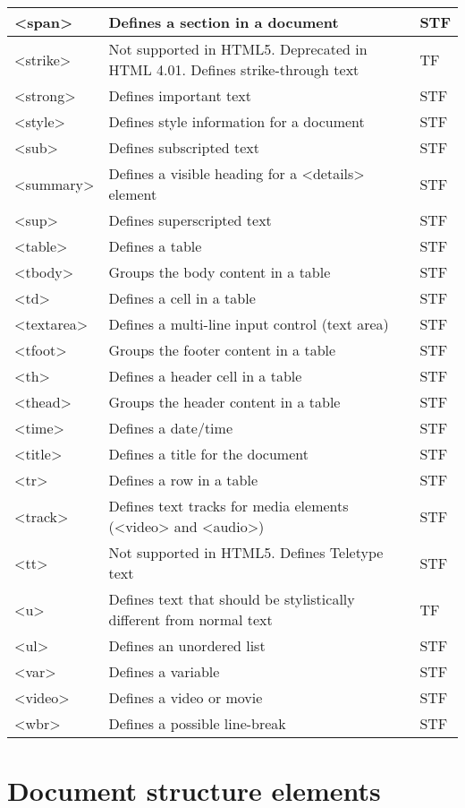 \begin{longtable}{|p{60pt}|p{320pt}|p{40pt}|}
\hline
<span>		&	Defines a section in a document & STF\\
\hline
<strike>		&	Not supported in HTML5. Deprecated in HTML 4.01. Defines strike-through text & TF\\
\hline
<strong>		&	Defines important text & STF\\
\hline
<style>		&	Defines style information for a document & STF \\
\hline
<sub>		&	Defines subscripted text & STF\\
\hline
<summary>	&	Defines a visible heading for a <details> element & STF\\
\hline
<sup>		&	Defines superscripted text & STF\\
\hline
<table>		&	Defines a table & STF\\
\hline
<tbody>		&	Groups the body content in a table & STF\\
\hline
<td>			&	Defines a cell in a table & STF\\
\hline
<textarea>	&	Defines a multi-line input control (text area) & STF\\
\hline
<tfoot>		&	Groups the footer content in a table & STF\\
\hline
<th>			&	Defines a header cell in a table & STF\\
\hline
<thead>		&	Groups the header content in a table & STF\\
\hline
<time>		&	Defines a date/time & STF\\
\hline
<title>		&	Defines a title for the document & STF\\
\hline
<tr>			&	Defines a row in a table & STF\\
\hline
<track>		&	Defines text tracks for media elements (<video> and <audio>) & STF\\
\hline
<tt>			&	Not supported in HTML5. Defines Teletype text & STF\\
\hline
<u>			&	Defines text that should be stylistically different from normal text & TF\\
\hline
<ul>			&	Defines an unordered list & STF\\
\hline
<var>		&	Defines a variable & STF\\
\hline
<video>		&	Defines a video or movie & STF\\
\hline
<wbr>		&	Defines a possible line-break & STF\\
\hline
\end{longtable}



\chapter{Document structure elements}


